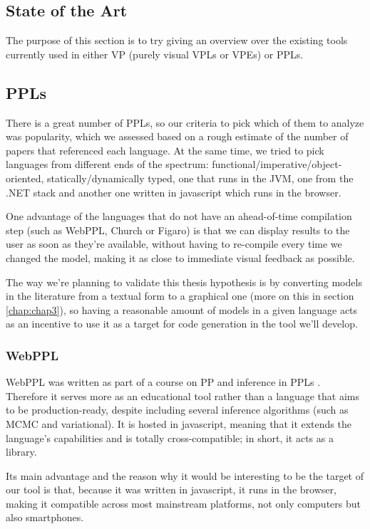 \begin{itemsize}
\section{State of the Art}
\label{sec:art}

The purpose of this section is to try giving an overview over the existing tools
currently used in either VP (purely visual VPLs or VPEs) or PPLs.

\subsection{PPLs}
\label{sec:ppls}

There is a great number of PPLs, so our criteria to pick which of them to analyze
was popularity, which we assessed based on a rough estimate of the number of papers
that referenced each language.
At the same time, we tried to pick languages from different
ends of the spectrum: functional/imperative/object-oriented, statically/dynamically
typed, one that runs in the JVM, one from the .NET stack and another one written
in javascript which runs in the browser.

One advantage of the languages that do not have an ahead-of-time compilation step
(such as WebPPL, Church or Figaro) is that we can display results to the user
as soon as they're available, without having to re-compile every time we changed
the model, making it as close to immediate visual feedback as possible.

The way we're planning to validate this thesis hypothesis is by converting
models in the literature from a textual form to a graphical one (more on this in
section \ref{chap:chap3}), so having
a reasonable amount of models in a given language acts as an incentive to use
it as a target for code generation in the tool we'll develop.

\subsubsection{WebPPL}
\label{sec:webppl}

WebPPL was written as part of a course on PP and inference in PPLs \cite{dippl}.
Therefore it serves more as an educational tool rather than a language that aims
to be production-ready, despite including several inference algorithms (such as
MCMC and variational). It is hosted in javascript, meaning that it extends
the language's capabilities and is totally cross-compatible; in short, it acts
as a library.

Its main advantage and the reason why it would be interesting
to be the target of our tool is that, because it was written in javascript, it runs
in the browser, making it compatible
across most mainstream platforms, not only computers but also smartphones.


\end{itemsize}
